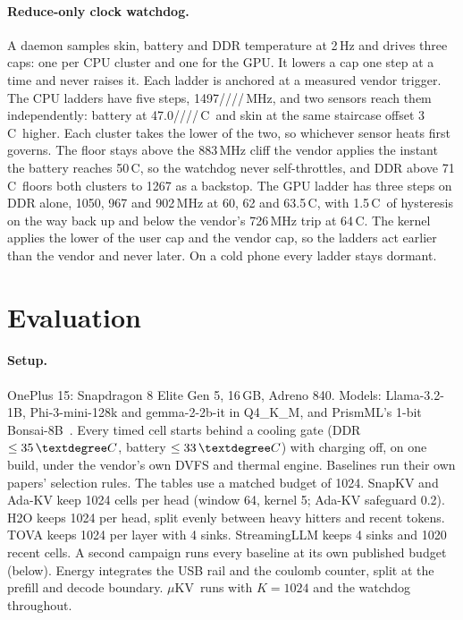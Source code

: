 \documentclass[sigconf, anonymous=false, screen=true, 10pt]{acmart}
\newcommand{\slb}{/\allowbreak}
\newcommand{\ub}{\_\allowbreak}
\newcommand{\muKV}{$\mu$KV}
\newcommand{\C}{\,\textdegree C}
\begin{document}
\paragraph{Reduce-only clock watchdog.} A daemon samples skin, battery and DDR temperature at 2\,Hz and drives three caps: one per CPU cluster and one for the GPU. It lowers a cap one step at a time and never raises it. Each ladder is anchored at a measured vendor trigger. The CPU ladders have five steps, 1497\slb 1382\slb 1267\slb 1132\slb 1017\,MHz, and two sensors reach them independently: battery at 47.0\slb 48.0\slb 48.5\slb 49.0\slb 49.5\C\ and skin at the same staircase offset 3\C\ higher. Each cluster takes the lower of the two, so whichever sensor heats first governs. The floor stays above the 883\,MHz cliff the vendor applies the instant the battery reaches 50\C, so the watchdog never self-throttles, and DDR above 71\C\ floors both clusters to 1267 as a backstop. The GPU ladder has three steps on DDR alone, 1050, 967 and 902\,MHz at 60, 62 and 63.5\C, with 1.5\C\ of hysteresis on the way back up and below the vendor's 726\,MHz trip at 64\C. The kernel applies the lower of the user cap and the vendor cap, so the ladders act earlier than the vendor and never later. On a cold phone every ladder stays dormant.

\section{Evaluation}
\label{sec:eval}

\paragraph{Setup.} OnePlus 15: Snapdragon 8 Elite Gen 5, 16\,GB, Adreno 840. Models: Llama-3.2-1B, Phi-3-mini-128k and gemma-2-2b-it in Q4\ub K\ub M, and PrismML's 1-bit Bonsai-8B~\cite{prismml2026bonsai}. Every timed cell starts behind a cooling gate (DDR $\le 35\C$, battery $\le 33\C$) with charging off, on one build, under the vendor's own DVFS and thermal engine. Baselines run their own papers' selection rules. The tables use a matched budget of 1024. SnapKV and Ada-KV keep 1024 cells per head (window 64, kernel 5; Ada-KV safeguard 0.2). H2O keeps 1024 per head, split evenly between heavy hitters and recent tokens. TOVA keeps 1024 per layer with 4 sinks. StreamingLLM keeps 4 sinks and 1020 recent cells. A second campaign runs every baseline at its own published budget (below). Energy integrates the USB rail and the coulomb counter, split at the prefill and decode boundary. \muKV\ runs with $K{=}1024$ and the watchdog throughout.
\end{document}

